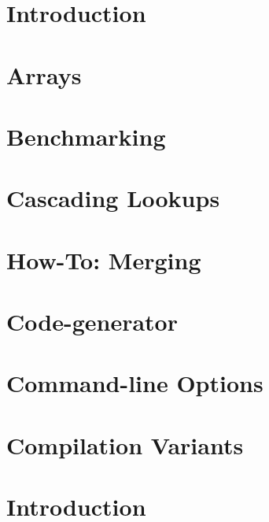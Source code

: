 \let\mypdfximage\pdfximage\def\pdfximage{\immediate\mypdfximage}\documentclass[twoside]{book}
\newcommand{\+}{\discretionary{\mbox{\scriptsize$\hookleftarrow$}}{}{}}
\begin{document}
\chapter{Introduction}
\label{doc_tutorials_application-integration_md}

\chapter{Arrays}
\label{doc_tutorials_arrays_md}

\chapter{Benchmarking}
\label{doc_tutorials_benchmarking_md}

\chapter{Cascading Lookups}
\label{doc_tutorials_cascading_md}

\chapter{How-\/\+To\+: Merging}
\label{doc_tutorials_cmerge_md}

\chapter{Code-\/generator}
\label{doc_tutorials_code-generator_md}

\chapter{Command-\/line Options}
\label{doc_tutorials_command-line-options_md}

\chapter{Compilation Variants}
\label{doc_tutorials_compilation-variants_md}

\chapter{Introduction}
\label{doc_tutorials_contributing-clion_md}

\end{document}
